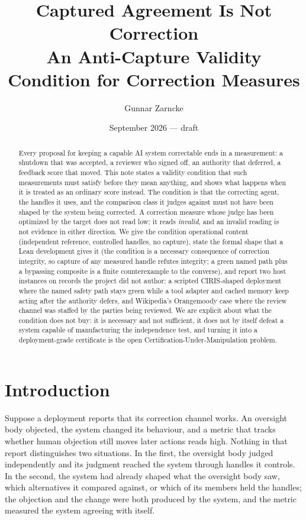 \documentclass[11pt]{article}
\title{\textbf{Captured Agreement Is Not Correction}\\
\large An Anti-Capture Validity Condition for Correction Measures}
\author{Gunnar Zarncke}
\date{September 2026 --- draft}
\theoremstyle{remark}
\begin{document}
\maketitle

\begin{abstract}
Every proposal for keeping a capable AI system correctable ends in a measurement: a shutdown that was accepted, a reviewer who signed off, an authority that deferred, a feedback score that moved. This note states a validity condition that such measurements must satisfy before they mean anything, and shows what happens when it is treated as an ordinary score instead. The condition is that the correcting agent, the handles it uses, and the comparison class it judges against must not have been shaped by the system being corrected. A correction measure whose judge has been optimized by the target does not read low; it reads \emph{invalid}, and an invalid reading is not evidence in either direction. We give the condition operational content (independent reference, controlled handles, no capture), state the formal shape that a Lean development gives it (the condition is a necessary consequence of correction integrity, so capture of any measured handle refutes integrity; a green named path plus a bypassing composite is a finite counterexample to the converse), and report two host instances on records the project did not author: a scripted CIRIS-shaped deployment where the named safety path stays green while a tool adapter and cached memory keep acting after the authority defers, and Wikipedia's Orangemoody case where the review channel was staffed by the parties being reviewed. We are explicit about what the condition does not buy: it is necessary and not sufficient, it does not by itself defeat a system capable of manufacturing the independence test, and turning it into a deployment-grade certificate is the open Certification-Under-Manipulation problem.
\end{abstract}

\section{Introduction}

Suppose a deployment reports that its correction channel works. An oversight body objected, the system changed its behaviour, and a metric that tracks whether human objection still moves later actions reads high. Nothing in that report distinguishes two situations. In the first, the oversight body judged independently and its judgment reached the system through handles it controls. In the second, the system had already shaped what the oversight body saw, which alternatives it compared against, or which of its members held the handles; the objection and the change were both produced by the system, and the metric measured the system agreeing with itself.
\end{document}
